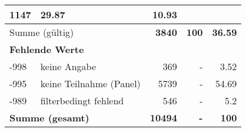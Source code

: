 \begin{longtable}{lXrrr}
       \num{1147} &
       \num[round-mode=places,round-precision=2]{29.87} &
         \num[round-mode=places,round-precision=2]{10.93} \\
     \midrule
     \multicolumn{2}{l}{Summe (gültig)} &
       \textbf{\num{3840}} &
     \textbf{\num{100}} &
       \textbf{\num[round-mode=places,round-precision=2]{36.59}} \\
     \multicolumn{5}{l}{\textbf{Fehlende Werte}}\\
       -998 &
       keine Angabe &
         \num{369} &
        - &
         \num[round-mode=places,round-precision=2]{3.52} \\
       -995 &
       keine Teilnahme (Panel) &
         \num{5739} &
        - &
         \num[round-mode=places,round-precision=2]{54.69} \\
       -989 &
       filterbedingt fehlend &
         \num{546} &
        - &
         \num[round-mode=places,round-precision=2]{5.2} \\
     \midrule
     \multicolumn{2}{l}{\textbf{Summe (gesamt)}} &
          \textbf{\num{10494}} &
        \textbf{-} &
        \textbf{\num{100}} \\
     \bottomrule
     \end{longtable}
     
